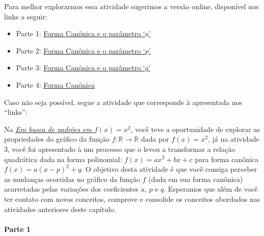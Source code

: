 \documentclass[10 pt,usenames,dvipsnames, oneside]{article}
\begin{document}
Para melhor explorarmos essa atividade sugerimos a versão online, disponível nos links a seguir:
\begin{itemize}
\item {} 
Parte 1: \href{https://ggbm.at/jdFEcyav}{Forma Canônica e o parâmetro ‘$a$’}

\item {} 
Parte 2: \href{https://ggbm.at/DmKxRtU9}{Forma Canônica e o parâmetro ‘$p$’}

\item {} 
Parte 3: \href{https://ggbm.at/Qcm5QFjH}{Forma Canônica e o parâmetro ‘$q$’}

\item {} 
Parte 4: \href{https://ggbm.at/jVJh78hz}{Forma Canônica}

\end{itemize}

Caso não seja possível, segue a atividade que corresponde à apresentada nos “links”:

Na \hyperref[\detokenize{AF209-2:ativ-funcao-quadratica-investigando-x-a-2}]{\textit{Em busca de padrões em \(f(x)=x^2\)}}, você teve a oportunidade de explorar as propriedades do gráfico da função \(f:\mathbb{R}\to\mathbb{R}\) dada por \(f(x)=x^2\), já na atividade 3, você foi apresentado à um processo que o levou a transformar a relação quadrática dada na forma polinomial: \(f(x)=ax^2 + bx + c\) para forma canônica \(f(x)=a(x-p)^2+q\). O objetivo desta atividade é que você consiga perceber as mudanças ocorridas no gráfico da função \(f\) (dada em sua forma canônica) acarretadas pelas variações dos coeficientes \(a\), \(p\) e \(q\). Esperamos que além de você ter contato com novos conceitos, comprove e consolide os conceitos abordados nas atividades anteriores deste capítulo.

\paragraph{Parte 1}
\end{document}
